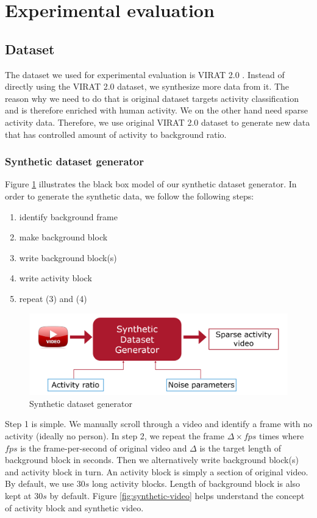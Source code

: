 \section{Experimental evaluation}
\label{sec:exp-eval}
\subsection{Dataset}
The dataset we used for experimental evaluation is VIRAT 2.0 \cite{virat20}. Instead of directly using the VIRAT 2.0 dataset, we synthesize more data from it. The reason why we need to do that is original dataset targets activity classification and is therefore enriched with human activity. We on the other hand need sparse activity data. Therefore, we use original VIRAT 2.0 dataset to generate new data that has controlled amount of activity to background ratio. 

\subsubsection{Synthetic dataset generator}
Figure \ref{fig:synthetic-dataset-generator} illustrates the black box model of our synthetic dataset generator. In order to generate the synthetic data, we follow the following steps:
\begin{enumerate} 
    \item identify background frame
    \item make background block
    \item write background block(s)
    \item write activity block
    \item repeat (3) and (4)
\end{enumerate}

\begin{figure}
    \centering
    \includegraphics[width=\linewidth]{images/synthetic-dataset-generator.PNG}
    \caption{Synthetic dataset generator}
    \label{fig:synthetic-dataset-generator}
\end{figure}

Step 1 is simple. We manually scroll through a video and identify a frame with no activity (ideally no person). In step 2, we repeat the frame $\Delta \times fps$ times where $fps$ is the frame-per-second of original video and $\Delta$ is the target length of background block in seconds. Then we alternatively write background block(s) and activity block in turn. An activity block is simply a section of original video. By default, we use $30s$ long activity blocks. Length of background block is also kept at $30s$ by default. Figure \ref{fig:synthetic-video} helps understand the concept of activity block and synthetic video.  

